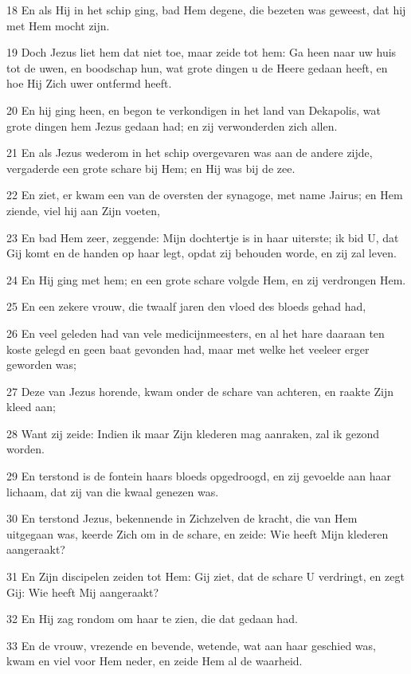 \par 18 En als Hij in het schip ging, bad Hem degene, die bezeten was geweest, dat hij met Hem mocht zijn.
\par 19 Doch Jezus liet hem dat niet toe, maar zeide tot hem: Ga heen naar uw huis tot de uwen, en boodschap hun, wat grote dingen u de Heere gedaan heeft, en hoe Hij Zich uwer ontfermd heeft.
\par 20 En hij ging heen, en begon te verkondigen in het land van Dekapolis, wat grote dingen hem Jezus gedaan had; en zij verwonderden zich allen.
\par 21 En als Jezus wederom in het schip overgevaren was aan de andere zijde, vergaderde een grote schare bij Hem; en Hij was bij de zee.
\par 22 En ziet, er kwam een van de oversten der synagoge, met name Jairus; en Hem ziende, viel hij aan Zijn voeten,
\par 23 En bad Hem zeer, zeggende: Mijn dochtertje is in haar uiterste; ik bid U, dat Gij komt en de handen op haar legt, opdat zij behouden worde, en zij zal leven.
\par 24 En Hij ging met hem; en een grote schare volgde Hem, en zij verdrongen Hem.
\par 25 En een zekere vrouw, die twaalf jaren den vloed des bloeds gehad had,
\par 26 En veel geleden had van vele medicijnmeesters, en al het hare daaraan ten koste gelegd en geen baat gevonden had, maar met welke het veeleer erger geworden was;
\par 27 Deze van Jezus horende, kwam onder de schare van achteren, en raakte Zijn kleed aan;
\par 28 Want zij zeide: Indien ik maar Zijn klederen mag aanraken, zal ik gezond worden.
\par 29 En terstond is de fontein haars bloeds opgedroogd, en zij gevoelde aan haar lichaam, dat zij van die kwaal genezen was.
\par 30 En terstond Jezus, bekennende in Zichzelven de kracht, die van Hem uitgegaan was, keerde Zich om in de schare, en zeide: Wie heeft Mijn klederen aangeraakt?
\par 31 En Zijn discipelen zeiden tot Hem: Gij ziet, dat de schare U verdringt, en zegt Gij: Wie heeft Mij aangeraakt?
\par 32 En Hij zag rondom om haar te zien, die dat gedaan had.
\par 33 En de vrouw, vrezende en bevende, wetende, wat aan haar geschied was, kwam en viel voor Hem neder, en zeide Hem al de waarheid.
